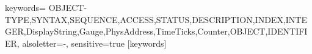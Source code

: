 {keywords=
	{OBJECT-TYPE,SYNTAX,SEQUENCE,ACCESS,STATUS,DESCRIPTION,INDEX,INTEGER,DisplayString,Gauge,PhysAddress,TimeTicks,Counter,OBJECT,IDENTIFIER},
	alsoletter=-,
	sensitive=true %
}[keywords]